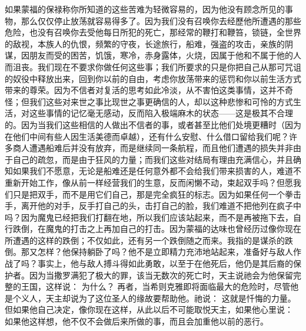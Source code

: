 如果蒙福的保禄称你所知道的这些苦难为轻微容易的，因为他没有顾念所见的事物，那么仅仅停止放荡就容易得多了。因为我们没有召唤你去经歷他所遭遇的那些危险，也没有召唤你去受他每日所犯的死亡，那经常的鞭打和鞭笞，锁链，全世界的敌视，本族人的仇恨，频繁的守夜，长途旅行，船难，强盗的攻击，亲族的阴谋，因朋友而受的困苦，饥饿，寒冷，赤身露体，火烧，因属于他和不属于他的人而沮丧。我们现在不要求你做任何这些事；我们所要求的只是你把自己从那可咒诅的奴役中释放出来，回到你以前的自由，考虑你放荡带来的惩罚和你以前生活方式带来的尊荣。因为不信者对复活的思考如此冷淡，从不害怕这类事情，这并不奇怪；但我们这些对来世之事比现世之事更确信的人，却以这种悲惨和可怜的方式生活，对这些事情的记忆毫无感动，反而陷入极端麻木的状态——这是极其不合理的。因为当我们这些相信的人做出不信者的事，或者甚至比他们处境更糟时（因为在他们中间有些人因生活美德而卓越），还有什么安慰、什么借口留给我们呢？许多商人遭遇船难后并没有放弃，而是继续同一条航程，而且他们遭遇的损失并非由于自己的疏忽，而是由于狂风的力量；而我们这些对结局有理由充满信心，并且确知如果我们不愿意，无论是船难还是任何意外都不会给我们带来损害的人，难道不重新开始工作，像从前一样经营我们的生意，反而闲懒不动，束起双手吗？但愿我们只是把双手，而不是用它们自己，那是完全疯狂的标志。因为如果任何一个拳击手，离开他的对手，反手打自己的头，击打自己的脸，我们难道不把他列在疯子中吗？因为魔鬼已经把我们打翻在地，所以我们应该站起来，而不是再被拖下去，自行跌倒，在魔鬼的打击之上再加自己的打击。因为蒙福的达味也曾经历过像你现在所遭遇的这样的跌倒；不仅如此，还有另一个跌倒随之而来。我指的是谋杀的跌倒。那又怎样？他保持躺卧了吗？他不是立即精力充沛地站起来，准备好与敌人作战了吗？事实上，他与敌人搏斗得如此勇敢，以至于在他死后，他仍是其后裔的保护者。因为当撒罗满犯了极大的罪，该当无数次的死亡时，天主说祂会为他保留完整的王国，这样说： 为什么？  再者，当希则克雅即将面临最大的危险时，尽管他是个义人，天主却说为了这位圣人的缘故要帮助他。祂说：  这就是忏悔的力量。但如果他自己决定，像你现在这样，从此以后不可能取悦天主，如果他心里说： 如果他这样想，他不仅不会做后来所做的事，而且会加重他以前的恶行。\par

